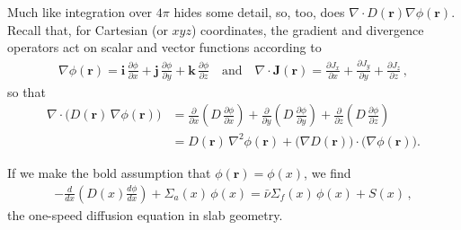 \documentclass[compact]{ne630handout}
\newcommand{\br}{\mathbf{r}}
\newcommand{\flux}{\phi}
\begin{document}
\begin{handoutflow}
Much like integration over $4\pi$ hides some detail, so, too, does $\nabla\!\cdot\! D(\br) \nabla \phi(\br)$.  Recall that, for Cartesian (or $xyz$) coordinates, the gradient and divergence operators act on scalar and vector functions according to
\begin{align*}
\nabla \phi(\mathbf{r})
= \mathbf{i} \,\frac{\partial \phi}{\partial x}
 + \mathbf{j}  \,\frac{\partial \phi}{\partial y}
 + \mathbf{k}  \,\frac{\partial \phi}{\partial z} \quad \text{and} \quad
\nabla\!\cdot\!\mathbf{J}(\mathbf{r})
= \frac{\partial J_x}{\partial x}
 + \frac{\partial J_y}{\partial y}
 + \frac{\partial J_z}{\partial z} \, ,
\end{align*}
so that
\begin{align*}
\nabla\!\cdot\!\big(D(\mathbf{r})\,\nabla \phi(\mathbf{r})\big)
&= \frac{\partial}{\partial x}\!\left(D\,\frac{\partial \phi}{\partial x}\right)
 + \frac{\partial}{\partial y}\!\left(D\,\frac{\partial \phi}{\partial y}\right)
 + \frac{\partial}{\partial z}\!\left(D\,\frac{\partial \phi}{\partial z}\right) \\[4pt]
&= D(\mathbf{r})\,\nabla^2 \phi(\mathbf{r})
  + \big(\nabla D(\mathbf{r})\big)\!\cdot\!\big(\nabla \phi(\mathbf{r})\big).
\end{align*}

If we make the bold assumption that $\phi(\mathbf{r}) = \phi(x)$, we find
\begin{align*}
\boxed{ - \frac{d}{dx} \left ( D(x) \frac{d\phi}{dx}   \right )
   + \Sigma_{a}(x)\, \flux(x)
  =  \bar{\nu}\Sigma_{f}(x)\, \flux(x) +  S(x)
} \, ,
\end{align*}
the one-speed diffusion equation in slab geometry.

\end{handoutflow}
\end{document}
